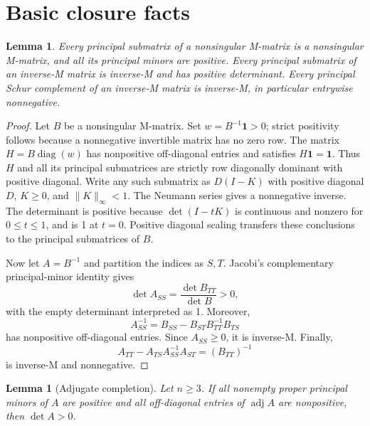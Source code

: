 \documentclass[11pt,a4paper]{article}
\newtheorem{lemma}[theorem]{Lemma}
\theoremstyle{remark}\newtheorem{remark}[theorem]{Remark}
\newcommand{\one}{\mathbf 1}
\newcommand{\diag}{\operatorname{diag}}
\newcommand{\adj}{\operatorname{adj}}
\begin{document}
\section{Basic closure facts}
\begin{lemma}\label{lem:closure}
Every principal submatrix of a nonsingular M-matrix is a nonsingular M-matrix, and all its principal minors are positive. Every principal submatrix of an inverse-M matrix is inverse-M and has positive determinant. Every principal Schur complement of an inverse-M matrix is inverse-M, in particular entrywise nonnegative.
\end{lemma}
\begin{proof}
Let $B$ be a nonsingular M-matrix. Set $w=B^{-1}\one>0$; strict positivity follows because a nonnegative invertible matrix has no zero row. The matrix $H=B\diag(w)$ has nonpositive off-diagonal entries and satisfies $H\one=\one$. Thus $H$ and all its principal submatrices are strictly row diagonally dominant with positive diagonal. Write any such submatrix as $D(I-K)$ with positive diagonal $D$, $K\ge0$, and $\|K\|_\infty<1$. The Neumann series gives a nonnegative inverse. The determinant is positive because $\det(I-tK)$ is continuous and nonzero for $0\le t\le1$, and is 1 at $t=0$. Positive diagonal scaling transfers these conclusions to the principal submatrices of $B$.

Now let $A=B^{-1}$ and partition the indices as $S,T$. Jacobi's complementary principal-minor identity gives
\[
 \det A_{SS}=\frac{\det B_{TT}}{\det B}>0,
\]
with the empty determinant interpreted as 1. Moreover,
\[
 A_{SS}^{-1}=B_{SS}-B_{ST}B_{TT}^{-1}B_{TS}
\]
has nonpositive off-diagonal entries. Since $A_{SS}\ge0$, it is inverse-M. Finally,
\[
 A_{TT}-A_{TS}A_{SS}^{-1}A_{ST}=(B_{TT})^{-1}
\]
is inverse-M and nonnegative.
\end{proof}
\begin{lemma}[Adjugate completion]\label{lem:adj}
Let $n\ge3$. If all nonempty proper principal minors of $A$ are positive and all off-diagonal entries of $\adj A$ are nonpositive, then $\det A>0$.
\end{lemma}
\end{document}

